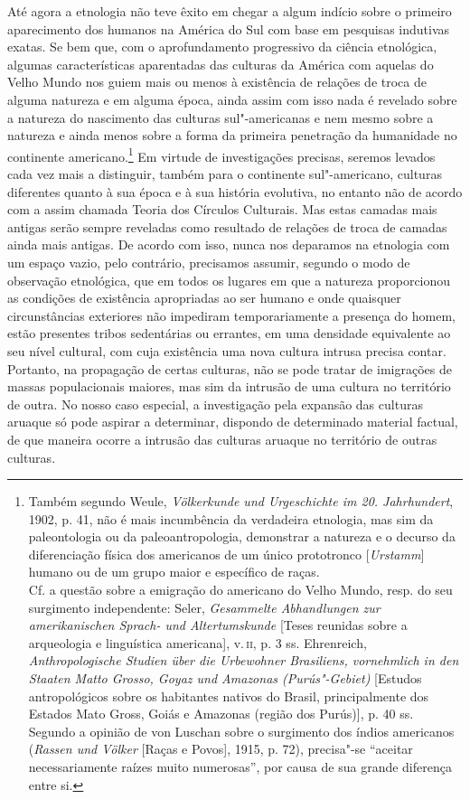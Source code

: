 Até agora a etnologia não teve êxito em chegar a algum indício sobre o
primeiro aparecimento dos humanos na América do Sul com base em
pesquisas indutivas exatas. Se bem que, com o aprofundamento progressivo
da ciência etnológica, algumas características aparentadas das culturas
da América com aquelas do Velho Mundo nos guiem mais ou menos à
existência de relações de troca de alguma natureza e em alguma época,
ainda assim com isso nada é revelado sobre a natureza do nascimento das
culturas sul"-americanas e nem mesmo sobre a natureza e ainda menos sobre
a forma da primeira penetração da humanidade no continente
americano.\footnote{Também segundo Weule, \emph{Völkerkunde und
  Urgeschichte im 20. Jahrhundert}, 1902, p. 41, não é mais incumbência
  da verdadeira etnologia, mas sim da paleontologia ou da
  paleoantropologia, demonstrar a natureza e o decurso da diferenciação
  física dos americanos de um único prototronco {[}\emph{Urstamm}{]}
  humano ou de um grupo maior e específico de raças.\\
  Cf. a questão sobre a emigração do americano do Velho Mundo, resp. do
  seu surgimento independente: Seler, \emph{Gesammelte Abhandlungen zur
  amerikanischen Sprach- und Altertumskunde} {[}Teses reunidas sobre a
  arqueologia e linguística americana{]}, v.\,\textsc{ii}, p. 3 ss. Ehrenreich,
  \emph{Anthropologische Studien über die Urbewohner Brasiliens,
  vornehmlich in den Staaten Matto Grosso, Goyaz und Amazonas
  (Purús"-Gebiet)} {[}Estudos antropológicos sobre os habitantes nativos
  do Brasil, principalmente dos Estados Mato Gross, Goiás e Amazonas
  (região dos Purús){]}, p. 40 ss. Segundo a opinião de von Luschan
  sobre o surgimento dos índios americanos (\emph{Rassen und Völker}
  {[}Raças e Povos{]}, 1915, p. 72), precisa"-se ``aceitar
  necessariamente raízes muito numerosas'', por causa de sua grande
  diferença entre si.} Em virtude de investigações precisas, seremos levados
cada vez mais a distinguir, também para o continente sul"-americano,
culturas diferentes quanto à sua época e à sua história evolutiva, no
entanto não de acordo com a assim chamada Teoria dos Círculos
Culturais. Mas estas camadas mais antigas serão sempre reveladas como
resultado de relações de troca de camadas ainda mais antigas. De acordo
com isso, nunca nos deparamos na etnologia com um espaço vazio, pelo
contrário, precisamos assumir, segundo o modo de observação etnológica,
que em todos os lugares em que a natureza proporcionou as condições de
existência apropriadas ao ser humano e onde quaisquer circunstâncias
exteriores não impediram temporariamente a presença do homem, estão
presentes tribos sedentárias ou errantes, em uma densidade equivalente
ao seu nível cultural, com cuja existência uma nova cultura intrusa
precisa contar. Portanto, na propagação de certas culturas, não se pode
tratar de imigrações de massas populacionais maiores, mas sim da
intrusão de uma cultura no território de outra. No nosso caso especial,
a investigação pela expansão das culturas aruaque só pode aspirar a
determinar, dispondo de determinado material factual, de que maneira
ocorre a intrusão das culturas aruaque no território de outras
culturas.

